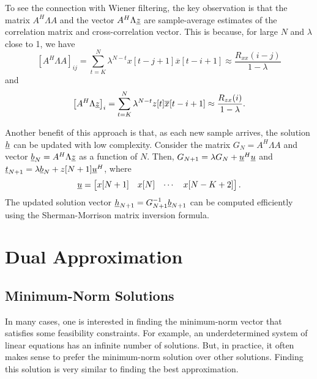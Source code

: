 To see the connection with Wiener filtering, the key observation is that the matrix $A^H \Lambda A$ and the vector $ A^H \Lambda \underline{z}$ are sample-average estimates of the correlation matrix and cross-correlation vector.
This is because, for large $N$ and $\lambda$ close to 1, we have
\[ \left[ A^H \Lambda A \right]_{ij} = \sum_{t=K}^N \lambda^{N-t} x[t-j+1] \overline{x}[t-i+1] \approx \frac{R_{xx}(i-j)}{1-\lambda} \]
and
\[ \left[ A^H \Lambda \underline{z} \right]_i = \sum_{t=K}^N \lambda^{N-t} z[t] \overline{x}[t-i+1] \approx \frac{R_{zx}(i)}{1-\lambda}. \]

Another benefit of this approach is that, as each new sample arrives, the solution $\underline{h}$ can be updated with low complexity.
Consider the matrix $G_N = A^H \Lambda A$ and vector $\underline{b}_N = A^H \Lambda \underline{z}$ as a function of $N$.
Then, $G_{N+1} = \lambda G_N + \underline{u}^H \underline{u}$ and $\underline{t}_{N+1} = \lambda \underline{b}_N + z[N+1] \underline{u}^H$, where
\begin{equation}
\underline{u} = \begin{bmatrix} x[N+1] & x[N] & \cdots & x[N-K+2] \end{bmatrix} .
\end{equation}
The updated solution vector $\underline{h}_{N+1} = G_{N+1}^{-1} \underline{b}_{N+1}$ can be computed efficiently using the Sherman-Morrison matrix inversion formula.


\section{Dual Approximation}

\subsection{Minimum-Norm Solutions}

In many cases, one is interested in finding the minimum-norm vector that satisfies some feasibility constraints.
For example, an underdetermined system of linear equations has an infinite number of solutions.
But, in practice, it often makes sense to prefer the minimum-norm solution over other solutions.
Finding this solution is very similar to finding the best approximation.


